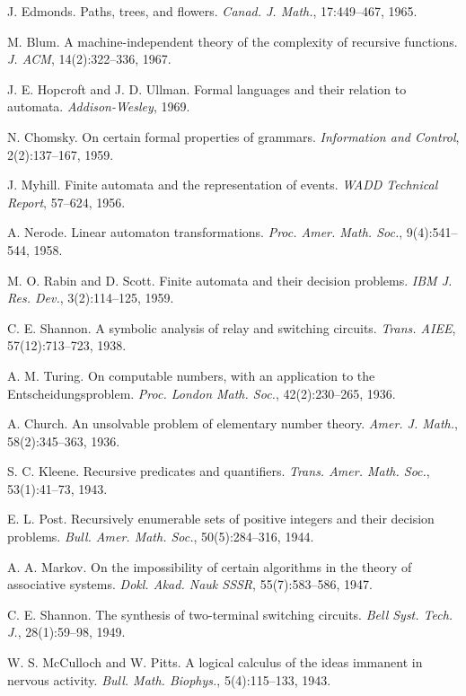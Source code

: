 \documentclass[11pt]{article}
\begin{document}
\begin{thebibliography}{99}
 J. Edmonds. Paths, trees, and flowers. \emph{Canad. J. Math.}, 17:449--467, 1965.

 M. Blum. A machine-independent theory of the complexity of recursive functions. \emph{J. ACM}, 14(2):322--336, 1967.

 J. E. Hopcroft and J. D. Ullman. Formal languages and their relation to automata. \emph{Addison-Wesley}, 1969.

 N. Chomsky. On certain formal properties of grammars. \emph{Information and Control}, 2(2):137--167, 1959.

 J. Myhill. Finite automata and the representation of events. \emph{WADD Technical Report}, 57--624, 1956.

 A. Nerode. Linear automaton transformations. \emph{Proc. Amer. Math. Soc.}, 9(4):541--544, 1958.

 M. O. Rabin and D. Scott. Finite automata and their decision problems. \emph{IBM J. Res. Dev.}, 3(2):114--125, 1959.

 C. E. Shannon. A symbolic analysis of relay and switching circuits. \emph{Trans. AIEE}, 57(12):713--723, 1938.

 A. M. Turing. On computable numbers, with an application to the Entscheidungsproblem. \emph{Proc. London Math. Soc.}, 42(2):230--265, 1936.

 A. Church. An unsolvable problem of elementary number theory. \emph{Amer. J. Math.}, 58(2):345--363, 1936.

 S. C. Kleene. Recursive predicates and quantifiers. \emph{Trans. Amer. Math. Soc.}, 53(1):41--73, 1943.

 E. L. Post. Recursively enumerable sets of positive integers and their decision problems. \emph{Bull. Amer. Math. Soc.}, 50(5):284--316, 1944.

 A. A. Markov. On the impossibility of certain algorithms in the theory of associative systems. \emph{Dokl. Akad. Nauk SSSR}, 55(7):583--586, 1947.

 C. E. Shannon. The synthesis of two-terminal switching circuits. \emph{Bell Syst. Tech. J.}, 28(1):59--98, 1949.

 W. S. McCulloch and W. Pitts. A logical calculus of the ideas immanent in nervous activity. \emph{Bull. Math. Biophys.}, 5(4):115--133, 1943.


\end{thebibliography}
\end{document}
